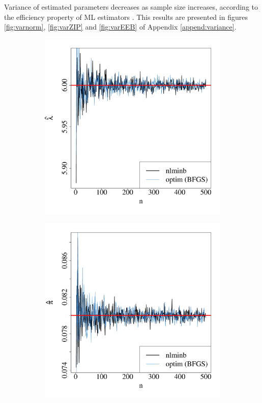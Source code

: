\documentclass[nojss]{jss}
\begin{document}
Variance of estimated parameters decreases as sample size increases, according to the efficiency property of ML estimators \citep{Gurland1954, Daniels1961}. This results are presented in figures \ref{fig:varnorm}, \ref{fig:varZIP} and \ref{fig:varEEB} of Appendix \ref{append:variance}.



\begin{figure}[H]
  \centering
    \begin{subfigure}[h]{0.49\textwidth}
        \includegraphics[width=\textwidth]{article-ZIPa}
        \caption{\label{fig:ZIPa}}
    \end{subfigure}
    \begin{subfigure}[h]{0.49\textwidth}
        \includegraphics[width=\textwidth]{article-ZIPb}

\end{subfigure}
\end{figure}
\end{document}
